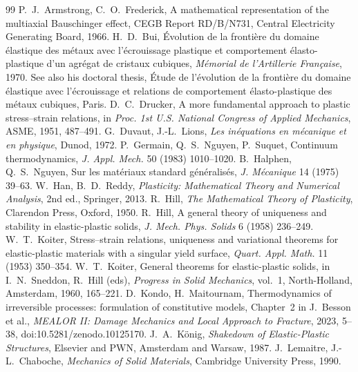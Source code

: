 \begin{chapterbib}{99}
 P.~J.~Armstrong, C.~O.~Frederick, A mathematical representation of the multiaxial Bauschinger effect, CEGB Report RD/B/N731, Central Electricity Generating Board, 1966.
 H.~D.~Bui, \'Evolution de la fronti\`ere du domaine \'elastique des m\'etaux avec l'\'ecrouissage plastique et comportement \'elasto-plastique d'un agr\'egat de cristaux cubiques, \emph{M\'emorial de l'Artillerie Fran\c{c}aise}, 1970. See also his doctoral thesis, \'Etude de l'\'evolution de la fronti\`ere du domaine \'elastique avec l'\'ecrouissage et relations de comportement \'elasto-plastique des m\'etaux cubiques, Paris.
 D.~C.~Drucker, A more fundamental approach to plastic stress--strain relations, in \emph{Proc. 1st U.S. National Congress of Applied Mechanics}, ASME, 1951, 487--491.
 G.~Duvaut, J.-L.~Lions, \emph{Les in\'equations en m\'ecanique et en physique}, Dunod, 1972.
 P.~Germain, Q.~S.~Nguyen, P.~Suquet, Continuum thermodynamics, \emph{J. Appl. Mech.} 50 (1983) 1010--1020.
 B.~Halphen, Q.~S.~Nguyen, Sur les mat\'eriaux standard g\'en\'eralis\'es, \emph{J. M\'ecanique} 14 (1975) 39--63.
 W.~Han, B.~D.~Reddy, \emph{Plasticity: Mathematical Theory and Numerical Analysis}, 2nd ed., Springer, 2013.
 R.~Hill, \emph{The Mathematical Theory of Plasticity}, Clarendon Press, Oxford, 1950.
 R.~Hill, A general theory of uniqueness and stability in elastic-plastic solids, \emph{J. Mech. Phys. Solids} 6 (1958) 236--249.
 W.~T.~Koiter, Stress--strain relations, uniqueness and variational theorems for elastic-plastic materials with a singular yield surface, \emph{Quart. Appl. Math.} 11 (1953) 350--354.
 W.~T.~Koiter, General theorems for elastic-plastic solids, in I.~N.~Sneddon, R.~Hill (eds), \emph{Progress in Solid Mechanics}, vol.~1, North-Holland, Amsterdam, 1960, 165--221.
 D.~Kondo, H.~Maitournam, Thermodynamics of irreversible processes: formulation of constitutive models, Chapter~2 in J.~Besson et al., \emph{MEALOR II: Damage Mechanics and Local Approach to Fracture}, 2023, 5--38, doi:10.5281/zenodo.10125170.
 J.~A.~K\"onig, \emph{Shakedown of Elastic-Plastic Structures}, Elsevier and PWN, Amsterdam and Warsaw, 1987.
 J.~Lemaitre, J.-L.~Chaboche, \emph{Mechanics of Solid Materials}, Cambridge University Press, 1990.

\end{chapterbib}
